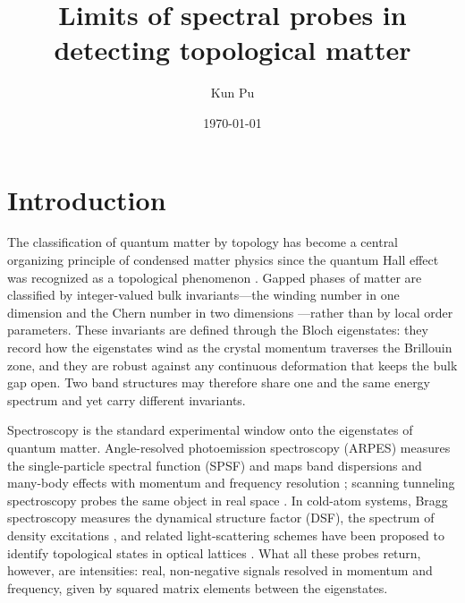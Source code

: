 \documentclass[onecolumn,aps,prl,superscriptaddress,longbibliography]{revtex4-2}
\begin{document}
	

\title{Limits of spectral probes in detecting topological matter}
\author{Kun Pu}
\date{\today}

\maketitle

\tableofcontents
\newpage

\section{Introduction}

The classification of quantum matter by topology has become a central organizing principle of condensed matter physics since the quantum Hall effect was recognized as a topological phenomenon \cite{klitzing1980,thouless1982}. Gapped phases of matter are classified by integer-valued bulk invariants---the winding number in one dimension \cite{su1979,asboth2016} and the Chern number in two dimensions \cite{thouless1982,hasanKane2010,qiZhang2011}---rather than by local order parameters. These invariants are defined through the Bloch eigenstates: they record how the eigenstates wind as the crystal momentum traverses the Brillouin zone, and they are robust against any continuous deformation that keeps the bulk gap open. Two band structures may therefore share one and the same energy spectrum and yet carry different invariants.

Spectroscopy is the standard experimental window onto the eigenstates of quantum matter. Angle-resolved photoemission spectroscopy (ARPES) measures the single-particle spectral function (SPSF) and maps band dispersions and many-body effects with momentum and frequency resolution \cite{lv2019,chen2020,sobota2021}; scanning tunneling spectroscopy probes the same object in real space \cite{yin2021}. In cold-atom systems, Bragg spectroscopy measures the dynamical structure factor (DSF), the spectrum of density excitations \cite{stenger1999,rey2005}, and related light-scattering schemes have been proposed to identify topological states in optical lattices \cite{goldman2012,wang2014}. What all these probes return, however, are intensities: real, non-negative signals resolved in momentum and frequency, given by squared matrix elements between the eigenstates.
\end{document}
